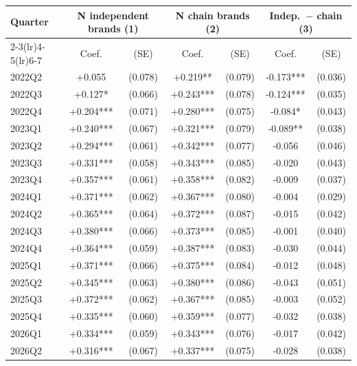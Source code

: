 \begin{tabular}{@{}lcccccc@{}}
\toprule
Quarter & \multicolumn{2}{c}{N independent brands (1)} & \multicolumn{2}{c}{N chain brands (2)} & \multicolumn{2}{c}{Indep.\ $-$ chain (3)}\\
\cmidrule(lr){2-3}\cmidrule(lr){4-5}\cmidrule(lr){6-7}
& Coef. & (SE) & Coef. & (SE) & Coef. & (SE) \\
\midrule
2022Q2 & +0.055 & (0.078) & +0.219** & (0.079) & -0.173*** & (0.036) \\
2022Q3 & +0.127* & (0.066) & +0.243*** & (0.078) & -0.124*** & (0.035) \\
2022Q4 & +0.204*** & (0.071) & +0.280*** & (0.075) & -0.084* & (0.043) \\
2023Q1 & +0.240*** & (0.067) & +0.321*** & (0.079) & -0.089** & (0.038) \\
2023Q2 & +0.294*** & (0.061) & +0.342*** & (0.077) & -0.056 & (0.046) \\
2023Q3 & +0.331*** & (0.058) & +0.343*** & (0.085) & -0.020 & (0.043) \\
2023Q4 & +0.357*** & (0.061) & +0.358*** & (0.082) & -0.009 & (0.037) \\
2024Q1 & +0.371*** & (0.062) & +0.367*** & (0.080) & -0.004 & (0.029) \\
2024Q2 & +0.365*** & (0.064) & +0.372*** & (0.087) & -0.015 & (0.042) \\
2024Q3 & +0.380*** & (0.066) & +0.373*** & (0.085) & -0.001 & (0.040) \\
2024Q4 & +0.364*** & (0.059) & +0.387*** & (0.083) & -0.030 & (0.044) \\
2025Q1 & +0.371*** & (0.066) & +0.375*** & (0.084) & -0.012 & (0.048) \\
2025Q2 & +0.345*** & (0.063) & +0.380*** & (0.086) & -0.043 & (0.051) \\
2025Q3 & +0.372*** & (0.062) & +0.367*** & (0.085) & -0.003 & (0.052) \\
2025Q4 & +0.335*** & (0.060) & +0.359*** & (0.077) & -0.032 & (0.038) \\
2026Q1 & +0.334*** & (0.059) & +0.343*** & (0.076) & -0.017 & (0.042) \\
2026Q2 & +0.316*** & (0.067) & +0.337*** & (0.075) & -0.028 & (0.038) \\
\bottomrule
\end{tabular}
